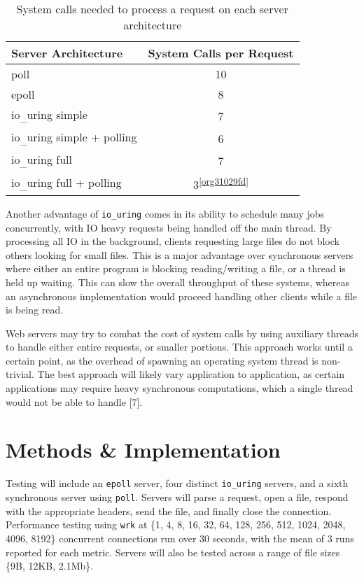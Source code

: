 \documentclass[conference]{IEEEtran}{}
\makeatletter
\newcommand{\cslcitation}[2]
 {\protect\hyper@linkstart{cite}{citeproc_bib_item_#1}#2\hyper@linkend}
\makeatother
\begin{document}
\begin{table}[htbp]
\caption{System calls needed to process a request on each server architecture}
\centering
\begin{tabular}{|l|c|}
Server Architecture & System Calls per Request\\
\hline
poll & 10\\
epoll & 8\\
io\textsubscript{\_}uring simple & 7\\
io\textsubscript{\_}uring simple + polling & 6\\
io\textsubscript{\_}uring full & 7\\
io\textsubscript{\_}uring full + polling & 3\textsuperscript{\ref{org31029fd}}\\
\end{tabular}
\end{table}

Another advantage of \texttt{io\_uring} comes in its ability to schedule many jobs concurrently, with IO heavy requests being handled off the main thread. By processing all IO in the background, clients requesting large files do not block others looking for small files. This is a major advantage over synchronous servers where either an entire program is blocking reading/writing a file, or a thread is held up waiting. This can slow the overall throughput of these systems, whereas an asynchronous implementation would proceed handling other clients while a file is being read.

Web servers may try to combat the cost of system calls by using auxiliary threads to handle either entire requests, or smaller portions. This approach works until a certain point, as the overhead of spawning an operating system thread is non-trivial. The best approach will likely vary application to application, as certain applications may require heavy synchronous computations, which a single thread would not be able to handle \cslcitation{7}{[7]}.
\section{Methods \& Implementation}
\label{sec:orgb08e24c}
Testing will include an \texttt{epoll} server, four distinct \texttt{io\_uring} servers, and a sixth synchronous server using \texttt{poll}. Servers will parse a request, open a file, respond with the appropriate headers, send the file, and finally close the connection. Performance testing using \texttt{wrk} at \{1, 4, 8, 16, 32, 64, 128, 256, 512, 1024, 2048, 4096, 8192\} concurrent connections run over 30 seconds, with the mean of 3 runs reported for each metric. Servers will also be tested across a range of file sizes \{9B, 12KB, 2.1Mb\}.
\end{document}
